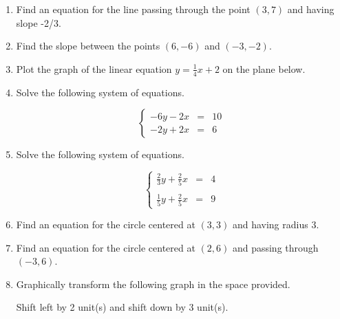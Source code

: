 \documentclass{article}
\begin{document}
\ReviewTitle[class={College Algebra}, for={Test 2}]

\begin{enumerate}
\item Find an equation for the line passing through the point $(3, 7)$ and having slope -2/3. \vspace{5cm}

\item Find the slope between the points $(6, -6)$ and $(-3, -2)$. \vspace{5cm}

\item Plot the graph of the linear equation $y = \frac{1}{4} x + 2$ on the plane below.\begin{center}
\CartesianPlane[h=7,w=7,axes=yes]
\end{center}

  

\newpage

\item Solve the following system of equations.

\[ \left\{ \begin{array}{rcl} -6y - 2x & = & 10 \\ -2y + 2x & = & 6 \end{array} \right. \] \vspace{5cm}

\item Solve the following system of equations.

\[ \left\{ \begin{array}{rcl} \frac{2}{3}y + \frac{2}{5}x & = & 4 \\ & & \\ \frac{1}{5}y + \frac{2}{5}x & = & 9 \end{array} \right. \] \vspace{5cm}

\item Find an equation for the circle centered at $(3, 3)$ and having radius $3$. \vspace{2cm}

\item Find an equation for the circle centered at $(2, 6)$ and passing through $(-3, 6)$. \vspace{5cm}

\newpage

\item Graphically transform the following graph in the space provided.

\begin{center}
Shift left by 2 unit(s) and shift down by 3 unit(s).
\end{center}


\end{enumerate}
\end{document}
